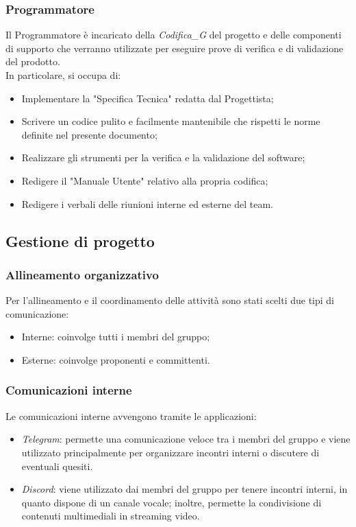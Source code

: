 \documentclass[12pt, oneside]{article}
\begin{document}
\subsubsection{Programmatore}
Il Programmatore è incaricato della \textit{Codifica_G} del progetto e delle componenti di supporto che verranno utilizzate per eseguire prove di verifica e di validazione del prodotto. \\
In particolare, si occupa di:
\begin{itemize}
    \item Implementare la "Specifica Tecnica" redatta dal Progettista;
    \item Scrivere un codice pulito e facilmente mantenibile che rispetti le norme definite nel presente documento;
    \item Realizzare gli strumenti per la verifica e la validazione del software;
    \item Redigere il "Manuale Utente" relativo alla propria codifica;
    \item Redigere i verbali delle riunioni interne ed esterne del team.
\end{itemize}

\subsection{Gestione di progetto}

\subsubsection{Allineamento organizzativo}
Per l'allineamento e il coordinamento delle attività sono stati scelti due tipi di comunicazione:
\begin{itemize}
    \item Interne: coinvolge tutti i membri del gruppo;
    \item Esterne: coinvolge proponenti e committenti.
\end{itemize}

\subsubsection{Comunicazioni interne}
Le comunicazioni interne avvengono tramite le applicazioni:
\begin{itemize}
    \item \textit{Telegram}: permette una comunicazione veloce tra i membri del gruppo e viene utilizzato principalmente per organizzare incontri interni o discutere di eventuali quesiti.
    \item \textit{Discord}: viene utilizzato dai membri del gruppo per tenere incontri interni, in quanto dispone di un canale vocale; inoltre, permette la condivisione di contenuti multimediali in streaming video.
\end{itemize}
\end{document}
